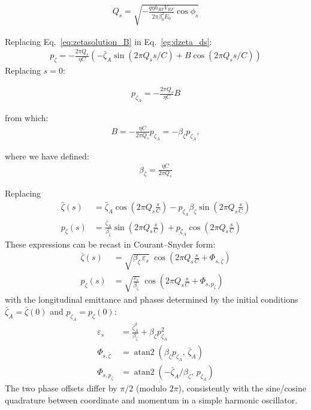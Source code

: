 \begin{align}
Q_s
= \sqrt{-  \frac{ q \eta h_{RF} V_{RF}}{2\pi\beta_0^2 E_0}\cos{\phi_s}}
\end{align}

Replacing Eq.~\ref{eq:zetasolution_B} in Eq.~\ref{eg:dzeta_ds}:
\begin{align}
p_\zeta = - \frac{2\pi Q_s} {\eta C} \left( -\bar{\zeta}_A \sin\left( 2 \pi Q_s s/C\right) + B \cos\left( 2 \pi Q_s s/C \right)\right)
\end{align}
Replacing $s=0$:

\begin{align}
p_{\zeta_A} = - \frac{2\pi Q_s} {\eta C} B
\end{align}

from which:
\begin{align}
B = -\frac{\eta C}{2\pi Q_s}p_{\zeta_A} = -\beta_\zeta p_{\zeta_A},
\end{align}

where we have defined:
\begin{align}
\beta_\zeta = \frac{\eta C}{2\pi Q_s}
\end{align}

Replacing
\begin{align}
\bar{\zeta}(s) &= \bar{\zeta}_A \cos\left( 2 \pi Q_s \frac{s}{C}\right) -p_{\zeta_A} \beta_\zeta \sin\left( 2 \pi Q_s \frac{s}{C} \right)\\
p_\zeta(s) &= \frac{\bar{\zeta}_A}{\beta_\zeta} \sin\left( 2 \pi Q_s \frac{s}{C}\right)
           + p_{\zeta_A} \cos\left( 2 \pi Q_s \frac{s}{C}\right)
\end{align}
These expressions can be recast in Courant--Snyder form:
\begin{align}
\bar{\zeta}(s) &= \sqrt{\beta_\zeta\,\varepsilon_s}\;\cos\left(2 \pi Q_s \frac{s}{C} + \Phi_{s,\bar{\zeta}}\right)\\
p_\zeta(s) &= \sqrt{\frac{\varepsilon_s}{\beta_\zeta}}\;\cos\left(2 \pi Q_s \frac{s}{C} + \Phi_{s,p_\zeta}\right)
\end{align}
with the longitudinal emittance and phases determined by the initial conditions $\bar{\zeta}_A=\bar{\zeta}(0)$ and $p_{\zeta_A}=p_\zeta(0)$:
\begin{align}
\varepsilon_s &= \frac{\bar{\zeta}_A^2}{\beta_\zeta} + \beta_\zeta p_{\zeta_A}^2\\
\Phi_{s,\bar{\zeta}} &= \operatorname{atan2}\!\left(\beta_\zeta p_{\zeta_A},\,\bar{\zeta}_A\right)\\
\Phi_{s,p_\zeta} &= \operatorname{atan2}\!\left(-\bar{\zeta}_A/\beta_\zeta,\, p_{\zeta_A}\right)
\end{align}
The two phase offsets differ by $\pi/2$ (modulo $2\pi$), consistently with the sine/cosine quadrature between coordinate and momentum in a simple harmonic oscillator.

